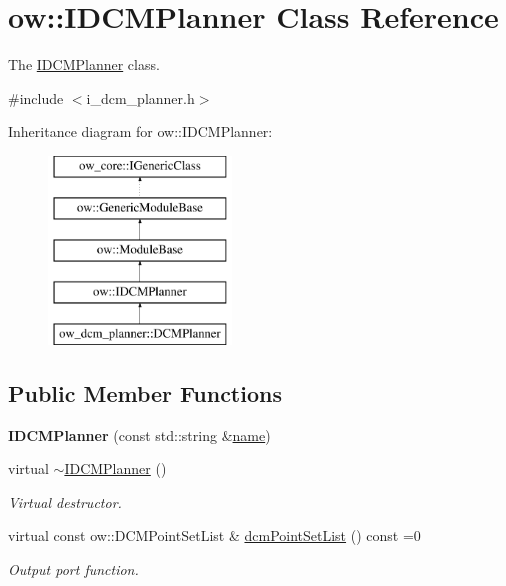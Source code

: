 \hypertarget{classow_1_1IDCMPlanner}{}\section{ow\+:\+:I\+D\+C\+M\+Planner Class Reference}
\label{classow_1_1IDCMPlanner}


The \hyperlink{classow_1_1IDCMPlanner}{I\+D\+C\+M\+Planner} class.  




{\ttfamily \#include $<$i\+\_\+dcm\+\_\+planner.\+h$>$}

Inheritance diagram for ow\+:\+:I\+D\+C\+M\+Planner\+:\begin{figure}[H]
\begin{center}
\leavevmode
\includegraphics[height=5.000000cm]{dd/da1/classow_1_1IDCMPlanner}
\end{center}
\end{figure}
\subsection*{Public Member Functions}
\begin{DoxyCompactItemize}
\item 
{\bfseries I\+D\+C\+M\+Planner} (const std\+::string \&\hyperlink{classow_1_1GenericModuleBase_a4b712883728cdbab7779e27f9a23689c}{name})\hypertarget{classow_1_1IDCMPlanner_a53d723c86945798888fa5d68cfa9dcfd}{}\label{classow_1_1IDCMPlanner_a53d723c86945798888fa5d68cfa9dcfd}

\item 
virtual \hyperlink{classow_1_1IDCMPlanner_a44f18545ecad2030712d21e5523d6bf1}{$\sim$\+I\+D\+C\+M\+Planner} ()\hypertarget{classow_1_1IDCMPlanner_a44f18545ecad2030712d21e5523d6bf1}{}\label{classow_1_1IDCMPlanner_a44f18545ecad2030712d21e5523d6bf1}

\begin{DoxyCompactList}\small\item\em Virtual destructor. \end{DoxyCompactList}\item 
virtual const ow\+::\+D\+C\+M\+Point\+Set\+List \& \hyperlink{classow_1_1IDCMPlanner_addf85aab043e49379fbe76c17ddae3c2}{dcm\+Point\+Set\+List} () const =0
\begin{DoxyCompactList}\small\item\em Output port function. \end{DoxyCompactList}\end{DoxyCompactItemize}
